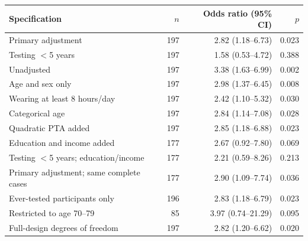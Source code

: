 \begin{tabular}{@{}lrrr@{}}
\toprule
Specification & $n$ & Odds ratio (95\% CI) & $p$\\
\midrule
Primary adjustment & 197 & 2.82 (1.18--6.73) & 0.023\\
Testing $<$5 years & 197 & 1.58 (0.53--4.72) & 0.388\\
Unadjusted & 197 & 3.38 (1.63--6.99) & 0.002\\
Age and sex only & 197 & 2.98 (1.37--6.45) & 0.008\\
Wearing at least 8 hours/day & 197 & 2.42 (1.10--5.32) & 0.030\\
Categorical age & 197 & 2.84 (1.14--7.08) & 0.028\\
Quadratic PTA added & 197 & 2.85 (1.18--6.88) & 0.023\\
Education and income added & 177 & 2.67 (0.92--7.80) & 0.069\\
Testing $<$5 years; education/income & 177 & 2.21 (0.59--8.26) & 0.213\\
Primary adjustment; same complete cases & 177 & 2.90 (1.09--7.74) & 0.036\\
Ever-tested participants only & 196 & 2.83 (1.18--6.79) & 0.023\\
Restricted to age 70--79 & 85 & 3.97 (0.74--21.29) & 0.095\\
Full-design degrees of freedom & 197 & 2.82 (1.20--6.62) & 0.020\\
\bottomrule
\end{tabular}
